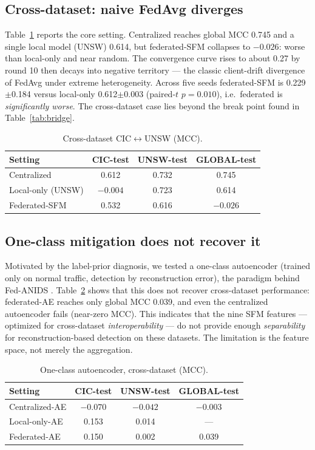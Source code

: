 \documentclass[11pt,a4paper]{article}
\begin{document}
\subsection{Cross-dataset: naive FedAvg diverges}
Table~\ref{tab:cross} reports the core setting. Centralized reaches global MCC
0.745 and a single local model (UNSW) 0.614, but federated-SFM collapses to
\(-0.026\): worse than local-only and near random. The convergence curve rises to
about 0.27 by round 10 then decays into negative territory --- the classic
client-drift divergence of FedAvg under extreme heterogeneity. Across five seeds
federated-SFM is 0.229\(\pm\)0.184 versus local-only 0.612\(\pm\)0.003 (paired-$t$
\(p=0.010\)), i.e.\ federated is \emph{significantly worse}. The cross-dataset
case lies beyond the break point found in Table~\ref{tab:bridge}.

\begin{table}[h]
\centering\small
\caption{Cross-dataset CIC$\leftrightarrow$UNSW (MCC).}
\label{tab:cross}
\begin{tabular}{@{}lccc@{}}
\toprule
Setting & CIC-test & UNSW-test & GLOBAL-test \\
\midrule
Centralized      & 0.612 & 0.732 & 0.745 \\
Local-only (UNSW)& $-0.004$ & 0.723 & 0.614 \\
Federated-SFM    & 0.532 & 0.616 & \textbf{$-0.026$} \\
\bottomrule
\end{tabular}
\end{table}

\subsection{One-class mitigation does not recover it}
\label{sec:oc}
Motivated by the label-prior diagnosis, we tested a one-class autoencoder
(trained only on normal traffic, detection by reconstruction error), the paradigm
behind Fed-ANIDS \cite{fedanids}. Table~\ref{tab:oc} shows that this does not
recover cross-dataset performance: federated-AE reaches only global MCC 0.039,
and even the centralized autoencoder fails (near-zero MCC). This indicates that
the nine SFM features --- optimized for cross-dataset \emph{interoperability} ---
do not provide enough \emph{separability} for reconstruction-based detection on
these datasets. The limitation is the feature space, not merely the aggregation.

\begin{table}[h]
\centering\small
\caption{One-class autoencoder, cross-dataset (MCC).}
\label{tab:oc}
\begin{tabular}{@{}lccc@{}}
\toprule
Setting & CIC-test & UNSW-test & GLOBAL-test \\
\midrule
Centralized-AE & $-0.070$ & $-0.042$ & $-0.003$ \\
Local-only-AE  & 0.153 & 0.014 & --- \\
Federated-AE   & 0.150 & 0.002 & 0.039 \\
\bottomrule
\end{tabular}
\end{table}
\end{document}

